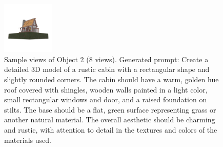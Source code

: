 \begin{figure}[htbp]
  \includegraphics[width=0.22\textwidth]{images/data/samples/obj2/007.jpeg}
  \caption{Sample views of Object 2 (8 views). Generated prompt: Create a detailed 3D model of a rustic cabin with a rectangular shape and slightly rounded corners. The cabin should have a warm, golden hue roof covered with shingles, wooden walls painted in a light color, small rectangular windows and door, and a raised foundation on stilts. The base should be a flat, green surface representing grass or another natural material. The overall aesthetic should be charming and rustic, with attention to detail in the textures and colors of the materials used.}
  \label{fig:dataset-sample-obj2}
\end{figure}


